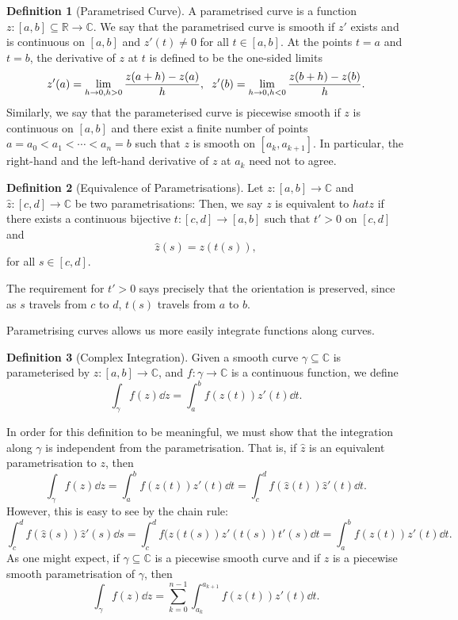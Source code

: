 \documentclass[
]{article}
\theoremstyle{definition}
\theoremstyle{definition}
\newtheorem{definition}{Definition}[section]
\begin{document}
\begin{definition}[Parametrised Curve]
  A parametrised curve is a function \(z : [a, b] \subseteq \mathbb{R} \to \mathbb{C}\).
  We say that the parametrised curve is smooth if \(z'\) exists and is continuous 
  on \([a, b]\) and \(z'(t) \neq 0\) for all \(t \in [a, b]\). At the points 
  \(t = a\) and \(t = b\), the derivative of \(z\) at \(t\) is defined to be the 
  one-sided limits 
  \[z'(a) = \lim_{h \to 0, h > 0} \frac{z(a + h) - z(a)}{h}, \hspace{2mm} 
    z'(b) = \lim_{h \to 0, h < 0} \frac{z(b + h) - z(b)}{h}.\]
  Similarly, we say that the parameterised curve is piecewise smooth if \(z\) is 
  continuous on \([a, b]\) and there exist a finite number of points 
  \(a = a_0 < a_1 < \cdots < a_n = b\) such that \(z\) is smooth on \([a_k, a_{k + 1}]\). 
  In particular, the right-hand and the left-hand derivative of \(z\) at \(a_k\) need not 
  to agree.
\end{definition}

\begin{definition}[Equivalence of Parametrisations]
  Let \(z : [a, b] \to \mathbb{C}\) and \(\hat{z} : [c, d] \to \mathbb{C}\) be two 
  parametrisations: Then, we say \(z\) is equivalent to \(hat{z}\) if there exists a 
  continuous bijective \(t : [c, d] \to [a, b]\) such that \(t' > 0\) on \([c, d]\) 
  and 
  \[\hat{z}(s) = z(t(s)),\]
  for all \(s \in [c, d]\).
\end{definition}

The requirement for \(t' > 0\) says precisely that the orientation is
preserved, since as \(s\) travels from \(c\) to \(d\), \(t(s)\) travels
from \(a\) to \(b\).

Parametrising curves allows us more easily integrate functions along
curves.

\begin{definition}[Complex Integration]
  Given a smooth curve \(\gamma \subseteq \mathbb{C}\) is parameterised by 
  \(z : [a, b] \to \mathbb{C}\), and \(f : \gamma \to \mathbb{C}\) is a 
  continuous function, we define 
  \[\int_\gamma f(z) \dd z = \int_a^b f(z(t)) z'(t) \dd t.\]
\end{definition}

In order for this definition to be meaningful, we must show that the
integration along \(\gamma\) is independent from the parametrisation.
That is, if \(\hat{z}\) is an equivalent parametrisation to \(z\),
then\\
\[\int_\gamma f(z) \dd z = \int_a^b f(z(t)) z'(t) \dd t = \int_c^d f(\hat{z}(t)) \hat{z}'(t) \dd t.\]
However, this is easy to see by the chain rule:
\[\int_c^d f(\hat{z}(s)) \hat{z}'(s) \dd s
  = \int_c^d f(z(t(s)) z'(t(s)) t'(s) \dd t = \int_a^b f(z(t)) z'(t) \dd t.\]
As one might expect, if \(\gamma \subseteq \mathbb{C}\) is a piecewise
smooth curve and if \(z\) is a piecewise smooth parametrisation of
\(\gamma\), then
\[\int_\gamma f(z) \dd z = \sum_{k = 0}^{n - 1} \int_{a_k}^{a_{k + 1}} f(z(t)) z'(t) \dd t.\]
\end{document}
